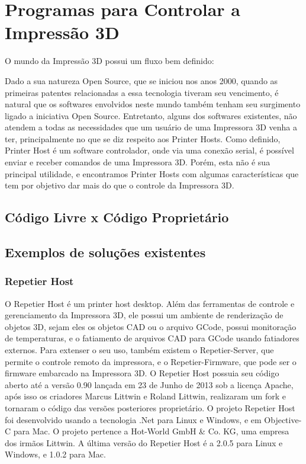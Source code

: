 \section{Programas para Controlar a Impressão 3D}
O mundo da Impressão 3D possui um fluxo bem definido:



Dado a sua natureza Open Source, que se iniciou nos anos 2000, quando as primeiras
patentes relacionadas a essa tecnologia tiveram seu vencimento, é natural que os
softwares envolvidos neste mundo também tenham seu surgimento ligado a iniciativa Open Source.
Entretanto, alguns dos softwares existentes, não atendem a todas as necessidades
que um usuário de uma Impressora 3D venha a ter, principalmente no que se diz respeito aos Printer Hosts.
Como definido, Printer Host é um software controlador, onde via uma conexão serial,
é possível enviar e receber comandos de uma Impressora 3D. Porém, esta não é sua
principal utilidade, e encontramos Printer Hosts com algumas características que
tem por objetivo dar mais do que o controle da Impressora 3D.

\subsection{Código Livre x Código Proprietário}

\subsection{Exemplos de soluções existentes}

\subsubsection{Repetier Host}
O Repetier Host é um printer host desktop. Além das
ferramentas de controle e gerenciamento da Impressora 3D, ele
possui um ambiente de renderização de objetos 3D, sejam eles
os objetos CAD ou o arquivo GCode, possui monitoração de
temperaturas, e o fatiamento de arquivos CAD para GCode
usando fatiadores externos. Para extenser o seu uso, também
existem o Repetier-Server, que permite o controle remoto da
impressora, e o Repetier-Firmware, que pode ser o firmware
embarcado na Impressora 3D. O Repetier Host possuia seu
código aberto até a versão 0.90 lançada em 23 de Junho de
2013 sob a licença Apache, após isso os criadores Marcus
Littwin e Roland Littwin, realizaram um fork e tornaram o
código das versões posteriores proprietário. O projeto
Repetier Host foi desenvolvido usando a tecnologia .Net para Linux e Windows, e
em Objective-C para Mac. O projeto pertence a Hot-World GmbH \& Co. KG, uma empresa dos
irmãos Littwin. A última versão do Repetier Host é a 2.0.5
para Linux e Windows, e 1.0.2 para Mac.
\iffalse
Referências:
- 0.90 codigo: https://github.com/repetier/Repetier-Host
- Licença: https://github.com/repetier/Repetier-Host/blob/master/APACHE-LICENSE-2.0.txt
- Author: https://www.repetier.com/about-us/
- Versão: https://www.repetier.com/download-now/
\fi

